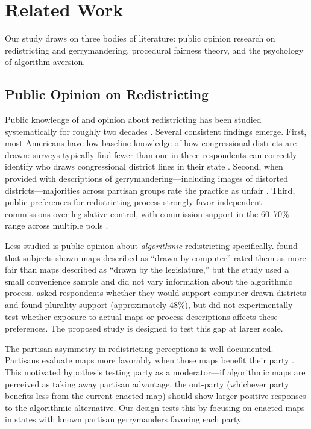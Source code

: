 \section{Related Work}
\label{sec:related}

Our study draws on three bodies of literature: public opinion research on redistricting and gerrymandering, procedural fairness theory, and the psychology of algorithm aversion.

\subsection{Public Opinion on Redistricting}

Public knowledge of and opinion about redistricting has been studied systematically for roughly two decades \citep{henderson2018,bandyopadhyay2013,clark2021}. Several consistent findings emerge. First, most Americans have low baseline knowledge of how congressional districts are drawn: surveys typically find fewer than one in three respondents can correctly identify who draws congressional district lines in their state \citep{gimpel2020,henderson2018}. Second, when provided with descriptions of gerrymandering---including images of distorted districts---majorities across partisan groups rate the practice as unfair \citep{elmendorf2019,nalder2019}. Third, public preferences for redistricting process strongly favor independent commissions over legislative control, with commission support in the 60--70\% range across multiple polls \citep{pew2017redistricting,gallup2019gerrymander}.

Less studied is public opinion about \textit{algorithmic} redistricting specifically. \citet{nalder2019} found that subjects shown maps described as ``drawn by computer'' rated them as more fair than maps described as ``drawn by the legislature,'' but the study used a small convenience sample and did not vary information about the algorithmic process. \citet{henderson2018} asked respondents whether they would support computer-drawn districts and found plurality support (approximately 48\%), but did not experimentally test whether exposure to actual maps or process descriptions affects these preferences. The proposed study is designed to test this gap at larger scale.

The partisan asymmetry in redistricting perceptions is well-documented. Partisans evaluate maps more favorably when those maps benefit their party \citep{clark2021,bonneau2021}. This motivated hypothesis testing party as a moderator---if algorithmic maps are perceived as taking away partisan advantage, the out-party (whichever party benefits less from the current enacted map) should show larger positive responses to the algorithmic alternative. Our design tests this by focusing on enacted maps in states with known partisan gerrymanders favoring each party.

